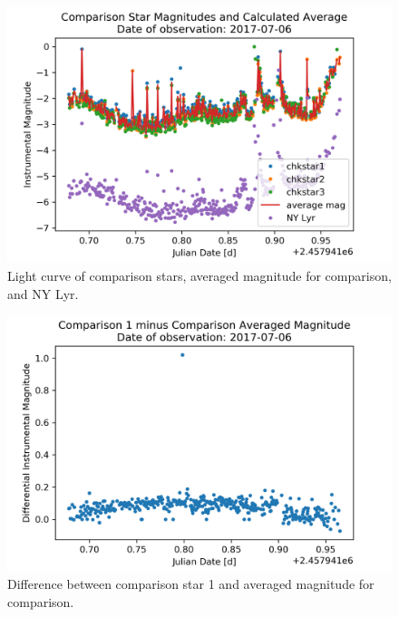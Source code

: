 \begin{figure}[h]
    \centering
    \includegraphics{figures/nylyr170706COM.png}
    \caption{Light curve of comparison stars, averaged magnitude for comparison, and NY Lyr.}
\label{fig:nyCOM}
\end{figure}

\begin{figure}[h]
    \centering
    \includegraphics{figures/nylyr170706CHK.png}
    \caption{Difference between comparison star 1 and averaged magnitude for comparison.}
\label{fig:nyCHK}
\end{figure}


